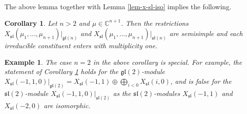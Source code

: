 \documentclass[12pt]{amsart}
\newtheorem{cor}[thm]{Corollary}
\newtheorem{examp}[thm]{Example}
\begin{document}
The above lemma together with Lemma \ref{lem-x-sl-iso} implies the following.
\begin{cor} \label{cor-mult-free-decomp}
Let $n>2$ and $\mu \in {\mathbb C}^{n+1}$. Then the restrictions $X_{\mathfrak{sl}}(\mu_1,...,\mu_{n+1})|_{\mathfrak{gl} (n)}$ and $X_{\mathfrak{sl}}(\mu_1,...,\mu_{n+1})|_{\mathfrak{sl} (n)}$ are semisimple and each irreducible constituent enters with multiplicity one.
\end{cor} 
\begin{examp} The case $n=2$ in the above corollary is special. For example, the statement of Corollary \ref{cor-mult-free-decomp} holds for the ${\mathfrak{gl}(2)}$-module $X_{\mathfrak{sl}} (-1,1,0)|_{\mathfrak{gl}(2)} = X_{\mathfrak{sl}}(-1,1)  \oplus \bigoplus_{i < 0} X_{\mathfrak{sl}}(i,0)$, and is false for the ${\mathfrak{sl}(2)}$-module  
$X_{\mathfrak{sl}} (-1,1,0)|_{\mathfrak{sl}(2)}$ as  the $\mathfrak{sl}(2)$-modules  $X_{\mathfrak{sl}} (-1,1)$ and $X_{\mathfrak{sl}}(-2,0)$ are isomorphic.
\end{examp}
\end{document}
